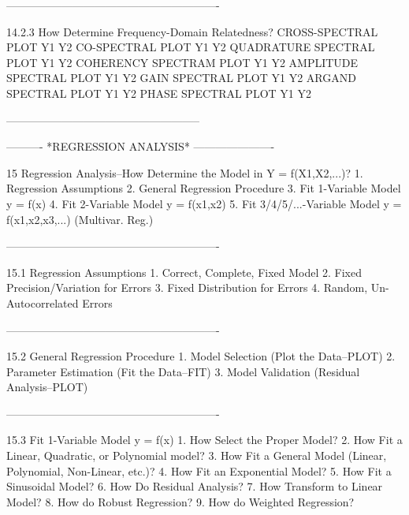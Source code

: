 ----------------------------------------------------------
 
14.2.3
How Determine Frequency-Domain Relatedness?
      CROSS-SPECTRAL PLOT Y1 Y2
      CO-SPECTRAL PLOT Y1 Y2
      QUADRATURE SPECTRAL PLOT Y1 Y2
      COHERENCY SPECTRAM PLOT Y1 Y2
      AMPLITUDE SPECTRAL PLOT Y1 Y2
      GAIN SPECTRAL PLOT Y1 Y2
      ARGAND SPECTRAL PLOT Y1 Y2
      PHASE SPECTRAL PLOT Y1 Y2
 
-----------------------------------------------------
 
 
 
 
 
 
 
 
 
 
 
 
 
 
 
 
 
 
 
 
 
 
 
 
 
 
 
 
 
 
 
 
 
----------  *REGRESSION ANALYSIS*  ----------------------
 
15
Regression Analysis--How Determine the Model in Y = f(X1,X2,...)?
   1. Regression Assumptions
   2. General Regression Procedure
   3. Fit 1-Variable Model y = f(x)
   4. Fit 2-Variable Model y = f(x1,x2)
   5. Fit 3/4/5/...-Variable Model y = f(x1,x2,x3,...) (Multivar. Reg.)
 
----------------------------------------------------------
 
15.1
Regression Assumptions
   1. Correct, Complete, Fixed Model
   2. Fixed Precision/Variation for Errors
   3. Fixed Distribution for Errors
   4. Random, Un-Autocorrelated Errors
 
----------------------------------------------------------
 
15.2
General Regression Procedure
   1. Model Selection (Plot the Data--PLOT)
   2. Parameter Estimation (Fit the Data--FIT)
   3. Model Validation (Residual Analysis--PLOT)
 
----------------------------------------------------------
 
15.3
Fit 1-Variable Model y = f(x)
   1. How Select the Proper Model?
   2. How Fit a Linear, Quadratic, or Polynomial model?
   3. How Fit a General Model (Linear, Polynomial, Non-Linear, etc.)?
   4. How Fit an Exponential Model?
   5. How Fit a Sinusoidal Model?
   6. How Do Residual Analysis?
   7. How Transform to Linear Model?
   8. How do Robust Regression?
   9. How do Weighted Regression?
 
